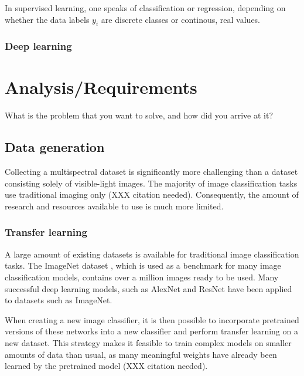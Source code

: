 \documentclass{l4proj}
\begin{document}
In supervised learning, one speaks of classification or regression, depending on whether the data labels $y_i$ are discrete classes or continous, real values.

\subsection{Deep learning}







\chapter{Analysis/Requirements}
What is the problem that you want to solve, and how did you arrive at it?

\section{Data generation}

Collecting a multispectral dataset is significantly more challenging than a dataset consisting solely of visible-light images. The majority of image classification tasks use traditional imaging only (XXX citation needed). Consequently, the amount of research and resources available to use is much more limited.

\subsection{Transfer learning}

A large amount of existing datasets is available for traditional image classification tasks. The ImageNet dataset \citep{deng_imagenet_2009}, which is used as a benchmark for many image classification models, contains over a million images ready to be used. Many successful deep learning models, such as AlexNet \citep{krizhevsky_imagenet_2012} and ResNet \citep{he_deep_2016} have been applied to datasets such as ImageNet.

When creating a new image classifier, it is then possible to incorporate pretrained versions of these networks into a new classifier and perform transfer learning on a new dataset. This strategy makes it feasible to train complex models on smaller amounts of data than usual, as many meaningful weights have already been learned by the pretrained model (XXX citation needed).
\end{document}
